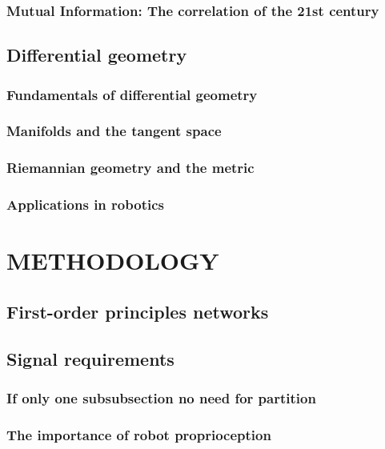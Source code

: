\documentclass{article}
\begin{document}
\subsubsection{Mutual Information: The correlation of the 21st century }
\subsection{Differential geometry}
\subsubsection{Fundamentals of differential geometry}
\subsubsection{Manifolds and the tangent space}
\subsubsection{Riemannian geometry and the metric}
\subsubsection{Applications in robotics}

\section{METHODOLOGY}
\subsection{First-order principles networks}
\subsection{Signal requirements}
\subsubsection{If only one subsubsection no need for partition}
\subsubsection{The importance of robot proprioception}
\end{document}
